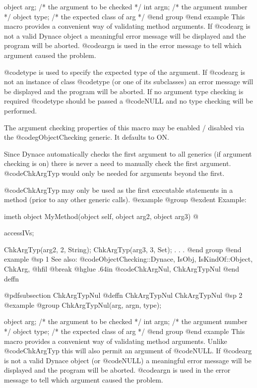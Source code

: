 {{object  arg;    /*  the argument to be checked  */
int     argn;   /*  the argument number         */
object  type;   /*  the expected class of arg   */
@end group
@end example
This macro provides a convenient way of validating method arguments.
If @code{arg} is not a valid Dynace object a meaningful error message
will be displayed and the program will be aborted.  @code{argn} is
used in the error message to tell which argument caused the problem.

@code{type} is used to specify the expected type of the argument.  If
@code{arg} is not an instance of class @code{type} (or one of its
subclasses) an error message will be displayed and the program will be
aborted.  If no argument type checking is required @code{type} should
be passed a @code{NULL} and no type checking will be performed.

The argument checking properties of this macro may be enabled / disabled
via the @code{gObjectChecking} generic.  It defaults to ON.

Since Dynace automatically checks the first argument to all generics (if
argument checking is on) there is never a need to manually check the
first argument.  @code{ChkArgTyp} would only be needed for arguments
beyond the first.

@code{ChkArgTyp} may only be used as the first executable statements in a
method (prior to any other generic calls).
@example
@group
@exdent Example:

imeth object  MyMethod(object self, object arg2, object arg3)
@{
        accessIVs;

        ChkArgTyp(arg2, 2, String);
        ChkArgTyp(arg3, 3, Set);
        .
        .
        .
@end group
@end example
@sp 1
See also:  @code{ObjectChecking::Dynace, IsObj, IsKindOf::Object, ChkArg,}
@hfil @break @hglue .64in @code{ChkArgNul, ChkArgTypNul}
@end deffn











@pdfsubsection {ChkArgTypNul}
@deffn {ChkArgTypNul} ChkArgTypNul
@sp 2
@example
@group
ChkArgTypNul(arg, argn, type);

object  arg;    /*  the argument to be checked  */
int     argn;   /*  the argument number         */
object  type;   /*  the expected class of arg   */
@end group
@end example
This macro provides a convenient way of validating method arguments.
Unlike @code{ChkArgTyp} this will also permit an argument of
@code{NULL}.  If @code{arg} is not a valid Dynace object (or
@code{NULL}) a meaningful error message will be displayed and the
program will be aborted.  @code{argn} is used in the error message to
tell which argument caused the problem.

}}}
